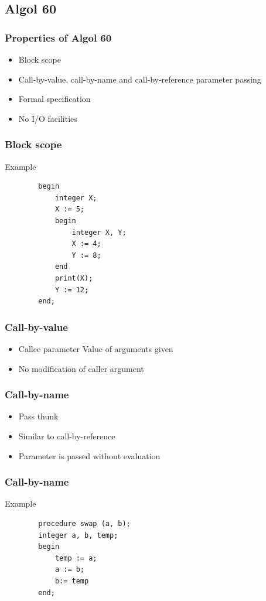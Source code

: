 \documentclass{beamer}
\begin{document}
\subsection{Algol 60}

\begin{frame}
	\frametitle{Properties of Algol 60}
	
	\begin{itemize}
		\item Block scope
		\item Call-by-value, call-by-name and call-by-reference parameter passing
		\item Formal specification
		\item No I/O facilities
	\end{itemize}
	
\end{frame}

\begin{frame}[fragile]
	\frametitle{Block scope}
	\begin{exampleblock}{Example}
		\begin{lstlisting}
		begin
		    integer X;
		    X := 5;
		    begin
		        integer X, Y;
		        X := 4;
		        Y := 8;
		    end
		    print(X);
		    Y := 12;
		end;
		\end{lstlisting}
	\end{exampleblock}
\end{frame}

\begin{frame}[fragile]
	\frametitle{Call-by-value}
	\begin{itemize}
		\item Callee parameter Value of arguments given
		\item No modification of caller argument
	\end{itemize}
	
\end{frame}

\begin{frame}[fragile]
	\frametitle{Call-by-name}
	\begin{itemize}
		\item Pass thunk
		\item Similar to call-by-reference
		\item Parameter is passed without evaluation
	\end{itemize}
	
\end{frame}

\begin{frame}[fragile]
	\frametitle{Call-by-name}
	
	\begin{exampleblock}{Example}
		\begin{lstlisting}
		procedure swap (a, b);
		integer a, b, temp;
		begin
		    temp := a;
		    a := b;
		    b:= temp
		end;
		\end{lstlisting}
	\end{exampleblock}
\end{frame}
\end{document}
